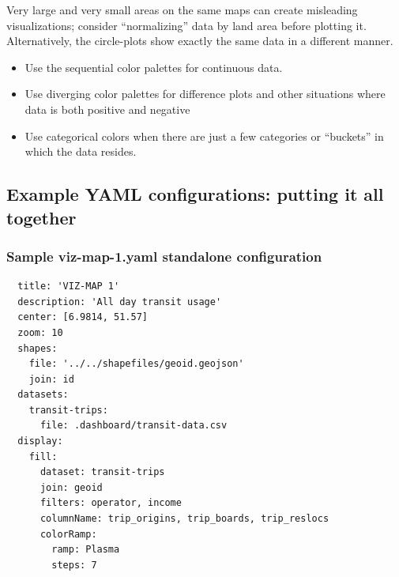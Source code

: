 Very large and very small areas on the same maps can create misleading
visualizations; consider ``normalizing'' data by land area before
plotting it. Alternatively, the circle-plots show exactly the same data
in a different manner.

\begin{itemize}
\tightlist
\item
  Use the sequential color palettes for continuous data.
\item
  Use diverging color palettes for difference plots and other situations
  where data is both positive and negative
\item
  Use categorical colors when there are just a few categories or
  ``buckets'' in which the data resides.
\end{itemize}

\hypertarget{example-yaml-configurations-putting-it-all-together}{%
\subsection{Example YAML configurations: putting it all
together}\label{example-yaml-configurations-putting-it-all-together}}

\hypertarget{sample-viz-map-1.yaml-standalone-configuration}{%
\subsubsection{Sample viz-map-1.yaml standalone
configuration}\label{sample-viz-map-1.yaml-standalone-configuration}}

\begin{lstlisting}
  title: 'VIZ-MAP 1'
  description: 'All day transit usage'
  center: [6.9814, 51.57]
  zoom: 10
  shapes:
    file: '../../shapefiles/geoid.geojson'
    join: id
  datasets:
    transit-trips:
      file: .dashboard/transit-data.csv
  display:
    fill:
      dataset: transit-trips
      join: geoid
      filters: operator, income
      columnName: trip_origins, trip_boards, trip_reslocs
      colorRamp:
        ramp: Plasma
        steps: 7
\end{lstlisting}

